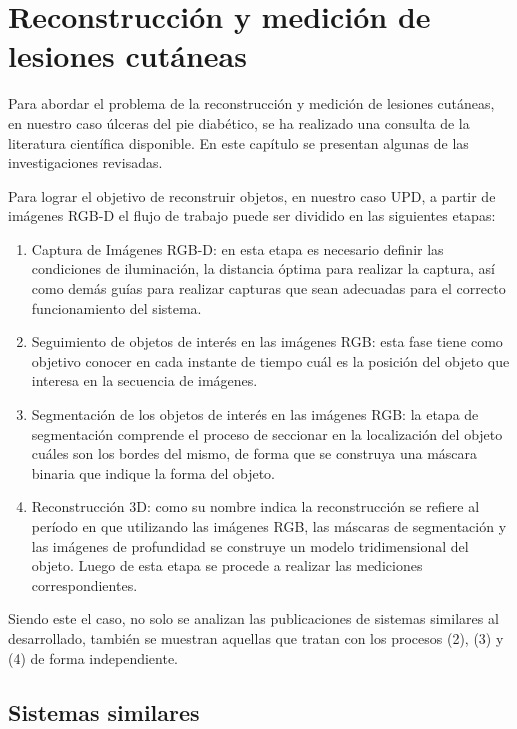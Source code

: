 \chapter{Reconstrucción y medición de lesiones cutáneas}\label{chapter:state-of-the-art}

Para abordar el problema de la reconstrucción y medición de lesiones cutáneas, en nuestro caso úlceras del pie diabético, se ha realizado una consulta de la literatura científica disponible. En este capítulo se presentan algunas de las investigaciones revisadas.

Para lograr el objetivo de reconstruir objetos, en nuestro caso UPD, a partir de imágenes RGB-D el flujo de trabajo puede ser dividido en las siguientes etapas: 
\begin{enumerate}
\item Captura de Imágenes RGB-D: en esta etapa es necesario definir las condiciones de iluminación, la distancia óptima para realizar la captura, así como demás guías para realizar capturas que sean adecuadas para el correcto funcionamiento del sistema.
\item Seguimiento de objetos de interés en las imágenes RGB: esta fase tiene como objetivo conocer en cada instante de tiempo cuál es la posición del objeto que interesa en la secuencia de imágenes.
\item Segmentación de los objetos de interés en las imágenes RGB: la etapa de segmentación comprende el proceso de seccionar en la localización del objeto cuáles son los bordes del mismo, de forma que se construya una máscara binaria que indique la forma del objeto.
\item Reconstrucción 3D: como su nombre indica la reconstrucción se refiere al período en que utilizando las imágenes RGB, las máscaras de segmentación y las imágenes de profundidad se construye un modelo tridimensional del objeto. Luego de esta etapa se procede a realizar las mediciones correspondientes.
\end{enumerate}

Siendo este el caso, no solo se analizan las publicaciones de sistemas similares al desarrollado, también se muestran aquellas que tratan con los procesos (2), (3) y (4) de forma independiente.

\section{Sistemas similares}

